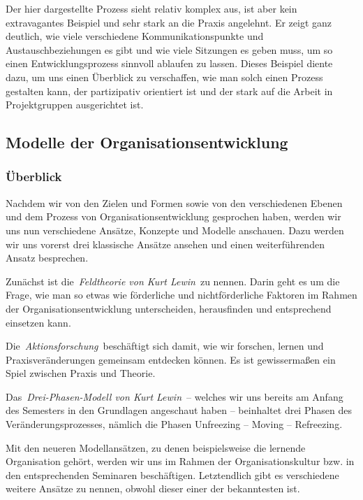 \documentclass[
  letterpaper,
]{book}
\begin{document}
Der hier dargestellte Prozess sieht relativ komplex aus, ist aber kein
extravagantes Beispiel und sehr stark an die Praxis angelehnt. Er zeigt
ganz deutlich, wie viele verschiedene Kommunikationspunkte und
Austauschbeziehungen es gibt und wie viele Sitzungen es geben muss, um
so einen Entwicklungsprozess sinnvoll ablaufen zu lassen. Dieses
Beispiel diente dazu, um uns einen Überblick zu verschaffen, wie man
solch einen Prozess gestalten kann, der partizipativ orientiert ist und
der stark auf die Arbeit in Projektgruppen ausgerichtet ist.

\subsection{Modelle der
Organisationsentwicklung}\label{modelle-der-organisationsentwicklung}

\subsubsection{Überblick}\label{uxfcberblick}

Nachdem wir von den Zielen und Formen sowie von den verschiedenen Ebenen
und dem Prozess von Organisationsentwicklung gesprochen haben, werden
wir uns nun verschiedene Ansätze, Konzepte und Modelle anschauen. Dazu
werden wir uns vorerst drei klassische Ansätze ansehen und einen
weiterführenden Ansatz besprechen.

Zunächst ist die~\emph{Feldtheorie von Kurt Lewin}~zu nennen. Darin geht
es um die Frage, wie man so etwas wie förderliche und nichtförderliche
Faktoren im Rahmen der Organisationsentwicklung unterscheiden,
herausfinden und entsprechend einsetzen kann.

Die~\emph{Aktionsforschung}~beschäftigt sich damit, wie wir forschen,
lernen und Praxisveränderungen gemeinsam entdecken können. Es ist
gewissermaßen ein Spiel zwischen Praxis und Theorie.

Das~\emph{Drei-Phasen-Modell von Kurt Lewin}~-- welches wir uns bereits
am Anfang des Semesters in den Grundlagen angeschaut haben -- beinhaltet
drei Phasen des Veränderungsprozesses, nämlich die Phasen Unfreezing --
Moving -- Refreezing.

Mit den neueren Modellansätzen, zu denen beispielsweise die lernende
Organisation gehört, werden wir uns im Rahmen der Organisationskultur
bzw. in den entsprechenden Seminaren beschäftigen. Letztendlich gibt es
verschiedene weitere Ansätze zu nennen, obwohl dieser einer der
bekanntesten ist.
\end{document}
